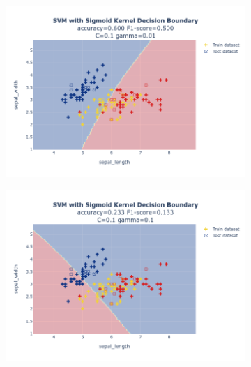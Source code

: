 \documentclass{article}
\begin{document}
\begin{figure}
\begin{subfigure}{0.3\textwidth}
        \includegraphics[scale=.13]{images/implementation/q1/sigmoid_kernel/sepal_length_sepal_width_0.1_0.01.png}
    \end{subfigure}
    \hfill
    \begin{subfigure}{0.3\textwidth}
        \centering
        \includegraphics[scale=.13]{images/implementation/q1/sigmoid_kernel/sepal_length_sepal_width_0.1_0.1.png}
    \end{subfigure}
    \newline
    \begin{subfigure}{0.3\textwidth}
        \centering

\end{subfigure}
\end{figure}
\end{document}

